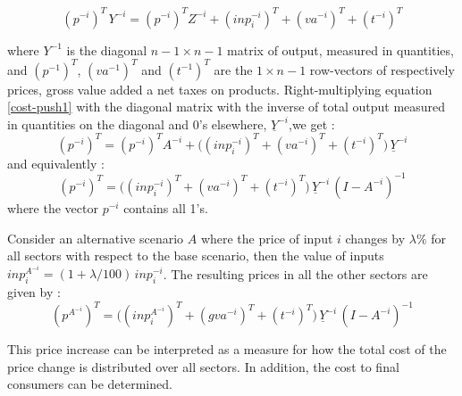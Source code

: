 \documentclass[12pt,english]{article}
\begin{document}
\begin{equation}
(p^{-i})^T \, Y^{-i} = (p^{-i})^T Z^{-i} + (inp^{-i}_i)^T + (va^{-i})^T + (t^{-i})^T \label{cost-push1}
\end{equation}

where $Y^{-1}$ is the diagonal $n-1 \times n-1$ matrix of output, measured in quantities, and $(p^{-1})^T$, $(va^{-1})^T$  and $(t^{-1})^T$ are the $1 \times n-1$ row-vectors of respectively prices, gross value added a net taxes on products. Right-multiplying equation \ref{cost-push1} with the diagonal matrix with the inverse of total output measured in quantities on the diagonal and 0's elsewhere, $\underline{Y}^{-i}$,we get :
\begin{equation}
(p^{-i})^T  = (p^{-i})^T A^{-i} + \Big((inp^{-i}_i)^T + (va^{-i})^T + (t^{-i})^T \Big)\, \underline{Y}^{-i} \label{cost-push2}
\end{equation}
and equivalently :
\begin{equation}
(p^{-i})^T  =  \Big((inp^{-i}_i)^T + (va^{-i})^T + (t^{-i})^T \Big)\, \underline{Y}^{-i} \, (I - A^{-i})^{-1} \label{cost-push3}
\end{equation}
where the vector $p^{-i}$ contains all 1's.

Consider an alternative scenario $A$ where the price of input $i$ changes by $\lambda\%$ for all sectors with respect to the base scenario, then the value of inputs $inp^{A^{-i}}_{i} = (1+\lambda/100)\, inp^{-i}_i$. The resulting prices in all the other sectors are given by :
\begin{equation}
(p^{A^{-i}})^T  =  \Big((inp^{A^{-i}}_i)^T + (gva^{-i})^T + (t^{-i})^T \Big)\, \underline{Y}^{-i} \, (I - A^{-i})^{-1} \label{cost-push-scen}
\end{equation}

This price increase can be interpreted as a measure for how the total cost of the price change is distributed over all sectors. In addition, the cost to final consumers can be determined. 


\end{document}
